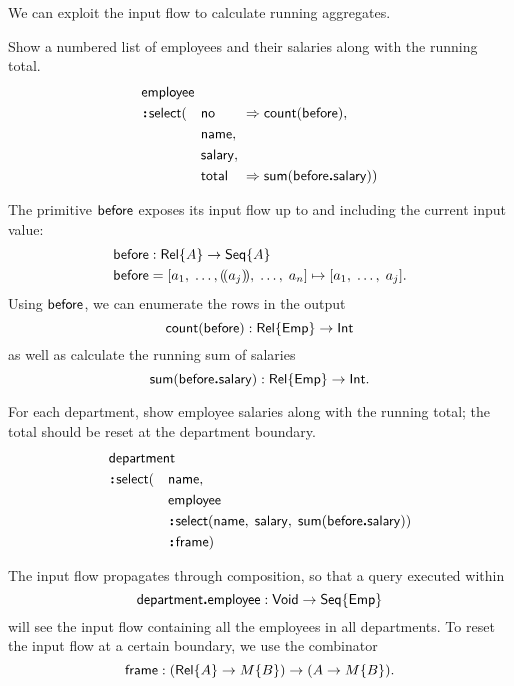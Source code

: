 We can exploit the input flow to calculate running aggregates.

\begin{demo}
    Show a numbered list of employees and their salaries along with the running
    total.
    \begin{alignat*}{3}
        & \Employee\hidewidth && && \\
        & \Apply\Select(&& \No && \As \Count(\Before), \\
        & && \Name,\hidewidth && \\
        & && \Salary,\hidewidth &&  \\
        & && \Total && \As \Sum(\Before\To\Salary))
    \end{alignat*}
\end{demo}

The primitive $\mathsf{before}$ exposes its input flow up to and including the current
input value:
\begin{align*}
    & \mathsf{before} : \mathsf{Rel}{\left\{A\right\}} \to \mathsf{Seq}{\left\{A\right\}} \\
    & \mathsf{before} = [a_1,\;\ldots,(\!(a_j)\!),\;\ldots,\;a_n] \mapsto [a_1,\;\ldots,\;a_j].
\end{align*}
Using $\mathsf{before}$, we can enumerate the rows in the output
\begin{equation*}
    \mathsf{count}(\mathsf{before}) : \mathsf{Rel}{\left\{\mathsf{Emp}\right\}} \to \mathsf{Int}
\end{equation*}
as well as calculate the running sum of salaries
\begin{equation*}
    \mathsf{sum}(\mathsf{before}\boldsymbol{.}\mathsf{salary}) : \mathsf{Rel}{\left\{\mathsf{Emp}\right\}} \to \mathsf{Int}.
\end{equation*}

\begin{demo}
    For each department, show employee salaries along with the running total;
    the total should be reset at the department boundary.
    \begin{alignat*}{2}
        & \Department\hidewidth && \\
        & \Apply\Select(&& \Name, \\
        & && \Employee \\
        & && \Apply\Select(\Name,\; \Salary,\; \Sum(\Before\To\Salary)) \\
        & && \Apply\Frame)
    \end{alignat*}
\end{demo}

The input flow propagates through composition, so that a query executed
within
\begin{equation*}
    \mathsf{department}\boldsymbol{.}\mathsf{employee} : \mathsf{Void} \to \mathsf{Seq}{\left\{\mathsf{Emp}\right\}}
\end{equation*}
will see the input flow containing all the employees in all departments.  To
reset the input flow at a certain boundary, we use the combinator
\begin{equation*}
    \mathsf{frame} : (\mathsf{Rel}{\left\{A\right\}} \to M{\left\{B\right\}}) \to (A \to M{\left\{B\right\}}).
\end{equation*}


